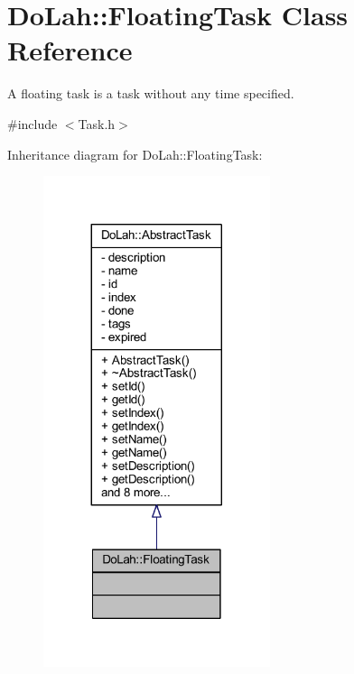 \hypertarget{class_do_lah_1_1_floating_task}{}\section{Do\+Lah\+:\+:Floating\+Task Class Reference}
\label{class_do_lah_1_1_floating_task}


A floating task is a task without any time specified.  




{\ttfamily \#include $<$Task.\+h$>$}



Inheritance diagram for Do\+Lah\+:\+:Floating\+Task\+:\nopagebreak
\begin{figure}[H]
\begin{center}
\leavevmode
\includegraphics[width=188pt]{class_do_lah_1_1_floating_task__inherit__graph}
\end{center}
\end{figure}


